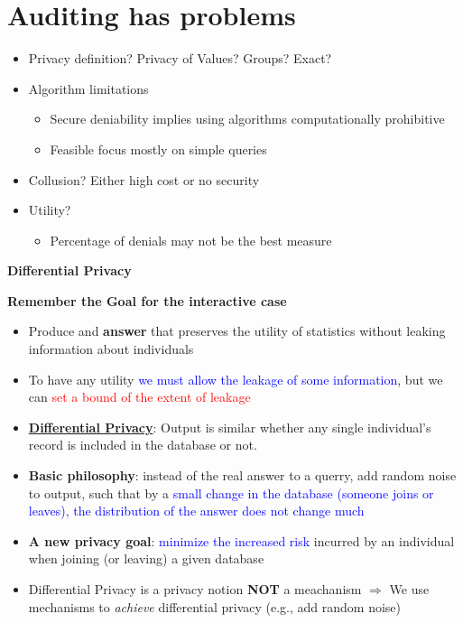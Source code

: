 \documentclass[11pt]{article}
\begin{document}
\section*{Auditing has problems}
\begin{itemize}
	\item Privacy definition? Privacy of Values? Groups? Exact?
	\item Algorithm limitations
		\begin{itemize}
			\item Secure deniability implies using algorithms computationally prohibitive
	\item Feasible focus mostly on simple queries
\end{itemize}
	\item Collusion? Either high cost or no security
	\item Utility?
		\begin{itemize}
			\item Percentage of denials may not be the best measure
		\end{itemize}
\end{itemize}

\vspace{0.5cm}

\begin{center}
  {\LARGE \textbf{Differential Privacy}}
\end{center}
\vspace{0.5cm}

\textbf{Remember the Goal for the interactive case}

\begin{itemize}
	\item Produce and \textbf{answer} that preserves the utility of statistics without leaking information about individuals
	\item To have any utility \textcolor{blue}{we must allow the leakage of some information}, but we can \textcolor{red}{set a bound of the extent of leakage}
	\item \textbf{\underline{Differential Privacy}}: Output is similar whether any single individual's record is included in the database or not.
\end{itemize}

\begin{itemize}
	\item \textbf{Basic philosophy}: instead of the real answer to a querry, add random noise to output, such that by a \textcolor{blue}{small change in the database (someone joins or leaves), the distribution of the answer does not change much}
	\item \textbf{A new privacy goal}: \textcolor{blue}{minimize the increased risk} incurred by an individual when joining (or leaving) a given database
	\item Differential Privacy is a privacy notion \textbf{NOT} a meachanism $\Rightarrow$ We use mechanisms to  \textit{achieve} differential privacy (e.g., add random noise)
\end{itemize}
\end{document}
